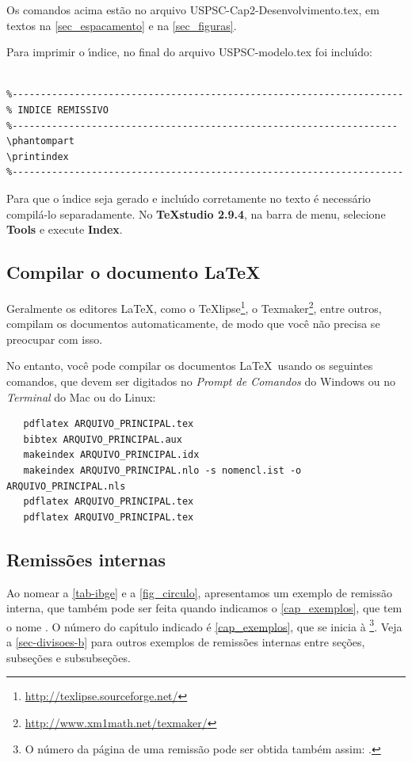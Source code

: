 Os comandos acima est\~ao no arquivo USPSC-Cap2-Desenvolvimento.tex, em textos na  \autoref{sec_espacamento}  e na  \autoref{sec_figuras}.

Para imprimir o \'{\i}ndice, no final do arquivo USPSC-modelo.tex foi inclu\'{\i}do:

\begin{verbatim}

%---------------------------------------------------------------------
% INDICE REMISSIVO
%--------------------------------------------------------------------
\phantompart
\printindex
%---------------------------------------------------------------------
\end{verbatim}

Para que o \'{\i}ndice seja gerado e inclu\'{\i}do corretamente no texto \'e necess\'ario compil\'a-lo separadamente. No \textbf{TeXstudio 2.9.4}, na barra de menu, selecione \textbf{Tools} e execute \textbf{Index}.


\subsection{Compilar o documento \LaTeX}

Geralmente os editores \LaTeX, como o
TeXlipse\footnote{\url{http://texlipse.sourceforge.net/}}, o
Texmaker\footnote{\url{http://www.xm1math.net/texmaker/}}, entre outros,
compilam os documentos automaticamente, de modo que voc\^e n\~ao precisa se
preocupar com isso.

No entanto, voc\^e pode compilar os documentos \LaTeX\ usando os seguintes
comandos, que devem ser digitados no \emph{Prompt de Comandos} do Windows ou no
\emph{Terminal} do Mac ou do Linux:

\begin{verbatim}
   pdflatex ARQUIVO_PRINCIPAL.tex
   bibtex ARQUIVO_PRINCIPAL.aux
   makeindex ARQUIVO_PRINCIPAL.idx 
   makeindex ARQUIVO_PRINCIPAL.nlo -s nomencl.ist -o ARQUIVO_PRINCIPAL.nls
   pdflatex ARQUIVO_PRINCIPAL.tex
   pdflatex ARQUIVO_PRINCIPAL.tex
\end{verbatim}

\subsection{Remiss\~oes internas}

Ao nomear a \autoref{tab-ibge} e a \autoref{fig_circulo}, apresentamos um exemplo de remiss\~ao interna, que tamb\'em pode ser feita quando indicamos o
\autoref{cap_exemplos}, que tem o nome \emph{}. O n\'umero
do cap\'{\i}tulo indicado \'e \ref{cap_exemplos}, que se inicia \`a
\footnote{O n\'umero da p\'agina de uma remiss\~ao pode ser
	obtida tamb\'em assim:
	\pageref{cap_exemplos}.}.
Veja a \autoref{sec-divisoes-b} para outros exemplos de remiss\~oes internas entre
se\c{c}\~oes, subse\c{c}\~oes e subsubse\c{c}\~oes.

